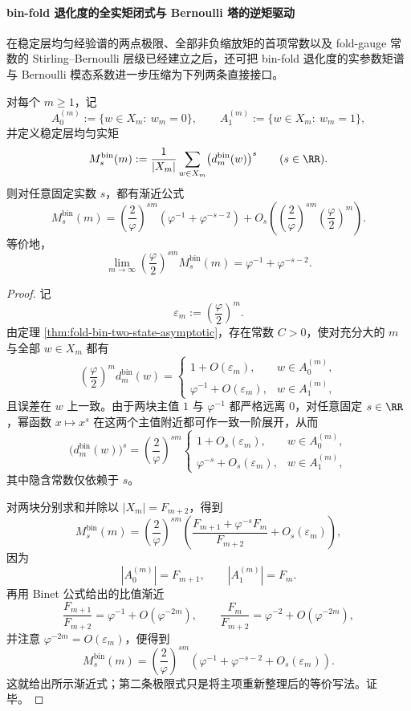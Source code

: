 \paragraph{bin-fold 退化度的全实矩闭式与 Bernoulli 塔的逆矩驱动}
在稳定层均匀经验谱的两点极限、全部非负缩放矩的首项常数以及 fold-gauge 常数的 Stirling--Bernoulli 层级已经建立之后，还可把 bin-fold 退化度的实参数矩谱与 Bernoulli 模态系数进一步压缩为下列两条直接接口。

\begin{theorem}\label{thm:xi-time-part70aa-binfold-all-real-moments-closed}
对每个 \(m\ge 1\)，记
\[
A_0^{(m)}:=\{w\in X_m:\ w_m=0\},
\qquad
A_1^{(m)}:=\{w\in X_m:\ w_m=1\},
\]
并定义稳定层均匀实矩
\[
M_s^{\mathrm{bin}}(m)
:=
\frac{1}{|X_m|}
\sum_{w\in X_m}\bigl(d_m^{\mathrm{bin}}(w)\bigr)^s
\qquad (s\in\RR).
\]
则对任意固定实数 \(s\)，都有渐近公式
\[
\boxed{\;
M_s^{\mathrm{bin}}(m)
=
\left(\frac{2}{\varphi}\right)^{sm}
\left(
\varphi^{-1}+\varphi^{-s-2}
\right)
+
O_s\!\left(
\left(\frac{2}{\varphi}\right)^{sm}
\left(\frac{\varphi}{2}\right)^m
\right).\;}
\]
等价地，
\[
\boxed{\;
\lim_{m\to\infty}
\left(\frac{\varphi}{2}\right)^{sm}
M_s^{\mathrm{bin}}(m)
=
\varphi^{-1}+\varphi^{-s-2}.\;}
\]
\end{theorem}
\begin{proof}
记
\[
\varepsilon_m:=\left(\frac{\varphi}{2}\right)^m.
\]
由定理 \ref{thm:fold-bin-two-state-asymptotic}，存在常数 \(C>0\)，使对充分大的 \(m\) 与全部 \(w\in X_m\) 都有
\[
\left(\frac{\varphi}{2}\right)^m d_m^{\mathrm{bin}}(w)
=
\begin{cases}
1+O(\varepsilon_m), & w\in A_0^{(m)},\\[4pt]
\varphi^{-1}+O(\varepsilon_m), & w\in A_1^{(m)},
\end{cases}
\]
且误差在 \(w\) 上一致。由于两块主值 \(1\) 与 \(\varphi^{-1}\) 都严格远离 \(0\)，对任意固定 \(s\in\RR\)，幂函数 \(x\mapsto x^s\) 在这两个主值附近都可作一致一阶展开，从而
\[
\bigl(d_m^{\mathrm{bin}}(w)\bigr)^s
=
\left(\frac{2}{\varphi}\right)^{sm}
\begin{cases}
1+O_s(\varepsilon_m), & w\in A_0^{(m)},\\[4pt]
\varphi^{-s}+O_s(\varepsilon_m), & w\in A_1^{(m)},
\end{cases}
\]
其中隐含常数仅依赖于 \(s\)。

对两块分别求和并除以 \(|X_m|=F_{m+2}\)，得到
\[
M_s^{\mathrm{bin}}(m)
=
\left(\frac{2}{\varphi}\right)^{sm}
\left(
\frac{F_{m+1}+\varphi^{-s}F_m}{F_{m+2}}
+
O_s(\varepsilon_m)
\right),
\]
因为
\[
|A_0^{(m)}|=F_{m+1},
\qquad
|A_1^{(m)}|=F_m.
\]
再用 Binet 公式给出的比值渐近
\[
\frac{F_{m+1}}{F_{m+2}}=\varphi^{-1}+O\!\left(\varphi^{-2m}\right),
\qquad
\frac{F_m}{F_{m+2}}=\varphi^{-2}+O\!\left(\varphi^{-2m}\right),
\]
并注意 \(\varphi^{-2m}=O(\varepsilon_m)\)，便得到
\[
M_s^{\mathrm{bin}}(m)
=
\left(\frac{2}{\varphi}\right)^{sm}
\left(
\varphi^{-1}+\varphi^{-s-2}
+
O_s(\varepsilon_m)
\right).
\]
这就给出所示渐近式；第二条极限式只是将主项重新整理后的等价写法。证毕。
\end{proof}

